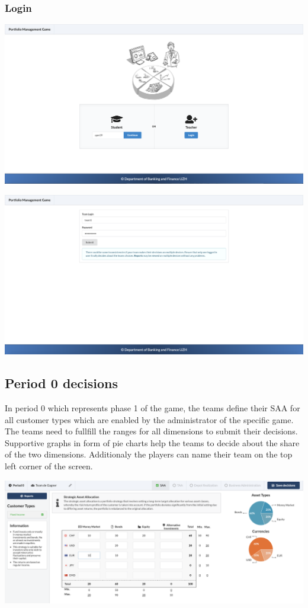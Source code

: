 \subsubsection{Login}
\begin{center}
  \includegraphics[scale=0.2]{img/application-overview/teams/startpage.png}
\end{center}
\begin{center}
  \includegraphics[scale=0.2]{img/application-overview/teams/login.png}
\end{center}

\subsection{Period 0 decisions}
In period 0 which represents phase 1 of the game, the teams define their SAA for all customer types which are enabled by the administrator of the specific game. The teams need to fullfill the ranges for all dimensions to submit their decisions. Supportive graphs in form of pie charts help the teams to decide about the share of the two dimensions. Additionaly the players can name their team on the top left corner of the screen.
\begin{center}
  \includegraphics[scale=0.2]{img/application-overview/teams/period_zero_decisions.png}
\end{center}

